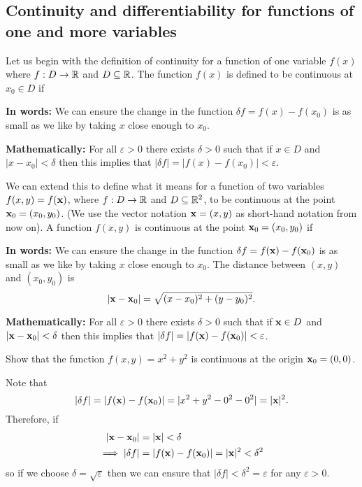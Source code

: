 \documentclass[10pt, a4paper]{article}
\begin{document}
\subsection{Continuity and differentiability for functions of one and more variables}
Let us begin with the definition of continuity for a function of one variable $f(x)$ where $f : D \rightarrow \mathbb{R}$ and $D \subseteq \mathbb{R}$.
The function $f(x)$ is defined to be continuous at $x_0 \in D$ if

\textbf{In words:}
We can ensure the change in the function $\delta f = f(x) - f(x_0)$ is as small as we like by taking $x$ close enough to $x_0$.

\textbf{Mathematically:}
For all $\varepsilon > 0$ there exists $\delta > 0$ such that if $x \in D$ and $|x - x_0| < \delta$ then this implies that $|\delta f| = |f(x) - f(x_0)| < \varepsilon$.

We can extend this to define what it means for a function of two variables $f(x, y) = f(\mathbf{x})$,
where $f : D \rightarrow \mathbb{R}$ and $D \subseteq \mathbb{R} ^ 2$,
to be continuous at the point $\mathbf{x}_0 = (x_0, y_0)$.
(We use the vector notation $\mathbf{x} = (x, y)$ as short-hand notation from now on).
A function $f(x, y)$ is continuous at the point $\mathbf{x}_0 = (x_0, y_0)$ if

\textbf{In words:}
We can ensure the change in the function $\delta f = f(\mathbf{x}) - f(\mathbf{x}_0)$ is as small as we like by taking $x$ close enough to $x_0$.
The distance between $(x, y)$ and $(x_0, y_0)$ is
\[
|\mathbf{x} - \mathbf{x}_0| = \sqrt{(x - x_0) ^ 2 + (y - y_0) ^ 2}.
\]

\textbf{Mathematically:}
For all $\varepsilon > 0$ there exists $\delta > 0$ such that if $\mathbf{x} \in D$ and $|\mathbf{x} - \mathbf{x}_0| < \delta$ then this implies that $|\delta f| = |f(\mathbf{x}) - f(\mathbf{x}_0)| < \varepsilon$.

\begin{example}
    Show that the function $f(x, y) = x ^ 2 + y ^ 2$ is continuous at the origin $\mathbf{x}_0 = (0, 0)$.
    \begin{solution}
        Note that
        \[
        |\delta f| = |f(\mathbf{x}) - f(\mathbf{x}_0)| = |x ^ 2 + y ^ 2 - 0 ^ 2 - 0 ^ 2| = |\mathbf{x}| ^ 2.
        \]
        Therefore,
        if
        \begin{align*}
            |\mathbf{x} - \mathbf{x}_0| &= |\mathbf{x}| < \delta \\
            \implies |\delta f| &= |f(\mathbf{x}) - f(\mathbf{x}_0)| = |\mathbf{x}| ^ 2 < \delta ^ 2
        \end{align*}
        so if we choose $\delta = \sqrt{\varepsilon}$ then we can ensure that $|\delta f| < \delta ^ 2 = \varepsilon$ for any $\varepsilon > 0$.
    \end{solution}
\end{example}
\end{document}
